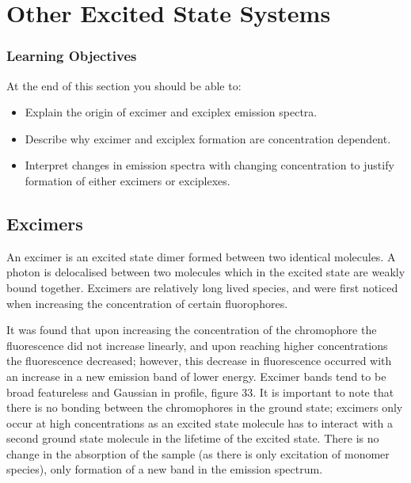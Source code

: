 \documentclass[
]{book}
\providecommand{\tightlist}{%
  \setlength{\itemsep}{0pt}\setlength{\parskip}{0pt}}
\begin{document}
\hypertarget{ch:excited}{%
\chapter{Other Excited State Systems}\label{ch:excited}}

\hypertarget{sec:exitedLOs}{%
\subsection{Learning Objectives}\label{sec:exitedLOs}}

At the end of this section you should be able to:

\begin{itemize}
\tightlist
\item
  Explain the origin of excimer and exciplex emission spectra.
\item
  Describe why excimer and exciplex formation are concentration dependent.
\item
  Interpret changes in emission spectra with changing concentration to justify formation of either excimers or exciplexes.
\end{itemize}

\hypertarget{sec:excimers}{%
\section{Excimers}\label{sec:excimers}}

An excimer is an excited state dimer formed between two identical molecules. A photon is delocalised between two molecules which in the excited state are weakly bound together. Excimers are relatively long lived species, and were first noticed when increasing the concentration of certain fluorophores.

It was found that upon increasing the concentration of the chromophore the fluorescence did not increase linearly, and upon reaching higher concentrations the fluorescence decreased; however, this decrease in fluorescence occurred with an increase in a new emission band of lower energy. Excimer bands tend to be broad featureless and Gaussian in profile, figure 33. It is important to note that there is no bonding between the chromophores in the ground state; excimers only occur at high concentrations as an excited state molecule has to interact with a second ground state molecule in the lifetime of the excited state. There is no change in the absorption of the sample (as there is only excitation of monomer species), only formation of a new band in the emission spectrum.
\end{document}
